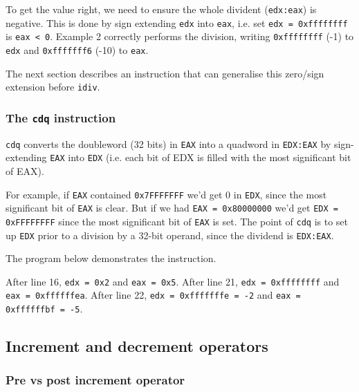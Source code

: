 \documentclass[a4paper]{article}
\begin{document}
To get the value right, we need to ensure the whole divident (\texttt{edx:eax}) is negative. This is done by sign extending \texttt{edx} into \texttt{eax}, i.e. set \texttt{edx = 0xffffffff} is \texttt{eax < 0}. Example 2 correctly performs the division, writing \texttt{0xffffffff} (-1) to \texttt{edx} and \texttt{0xfffffff6} (-10) to \texttt{eax}. 

The next section describes an instruction that can generalise this zero/sign extension before \texttt{idiv}.


\subsubsection{The \texttt{cdq} instruction}

\texttt{cdq} converts the doubleword (32 bits) in \texttt{EAX} into a quadword in \texttt{EDX:EAX} by sign-extending \texttt{EAX}  into \texttt{EDX} (i.e. each bit of EDX is filled with the most significant bit of EAX). 

For example, if \texttt{EAX}  contained \texttt{0x7FFFFFFF} we'd get 0 in \texttt{EDX}, since the most significant bit of \texttt{EAX} is clear. But if we had \texttt{EAX = 0x80000000} we'd get \texttt{EDX = 0xFFFFFFFF} since the most significant bit of \texttt{EAX} is set. The point of \texttt{cdq} is to set up \texttt{EDX} prior to a division by a 32-bit operand, since the dividend is \texttt{EDX:EAX}. 

The program below demonstrates the instruction.



After line 16, \texttt{edx = 0x2} and \texttt{eax = 0x5}. After line 21, \texttt{edx = 0xffffffff} and \texttt{eax = 0xffffffea}. After line 22, \texttt{edx = 0xfffffffe = -2} and \texttt{eax = 0xffffffbf = -5}.


\newpage
\subsection{Increment and decrement operators}
\label{app:pre_post_increment}

\subsubsection{Pre vs post increment operator}
\end{document}
